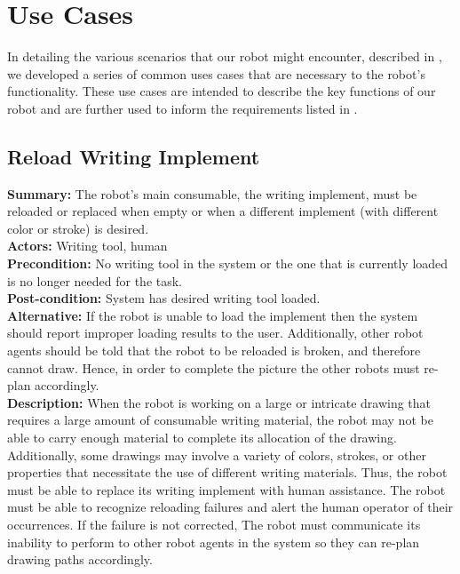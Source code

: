 
\section{Use Cases}
\label{sec:use_cases}
In detailing the various scenarios that our robot might encounter, described in , we developed a series of common uses cases that are necessary to the robot's functionality. These use cases are intended to describe the key functions of our robot and are further used to inform the requirements listed in .

\subsection{Reload Writing Implement}
\textbf{Summary:} The robot's main consumable, the writing implement, must be reloaded or replaced when empty or when a different implement (with different color or stroke) is desired. \\
\textbf{Actors:}  Writing tool, human \\
\textbf{Precondition:} No writing tool in the system or the one that is currently loaded is no longer needed for the task. \\
\textbf{Post-condition:} System has desired writing tool loaded. \\
\textbf{Alternative:} If the robot is unable to load the implement then the system should report improper loading results to the user. Additionally, other robot agents should be told that the robot to be reloaded is broken, and therefore cannot draw. Hence, in order to complete the picture the other robots must re-plan accordingly. \\
\textbf{Description:} When the robot is working on a large or intricate drawing that requires a large amount of consumable writing material, the robot may not be able to carry enough material to complete its allocation of the drawing. Additionally, some drawings may involve a variety of colors, strokes, or other properties that necessitate the use of different writing materials. Thus, the robot must be able to replace its writing implement with human assistance. The robot must be able to recognize reloading failures and alert the human operator of their occurrences. If the failure is not corrected, The robot must communicate its inability to perform to other robot agents in the system so they can re-plan drawing paths accordingly. \\

